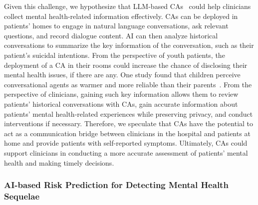 Given this challenge, we hypothesize that LLM-based CAs~\cite{yang2024talk2care, mahmood2023llm, chan2024human} could help clinicians collect mental health-related information effectively. 
CAs can be deployed in patients' homes to engage in natural language conversations, ask relevant questions, and record dialogue content. 
AI can then analyze historical conversations to summarize the key information of the conversation, such as their patient's suicidal intentions. 
From the perspective of youth patients, the deployment of a CA in their rooms could increase the chance of disclosing their mental health issues, if there are any.
One study found that children perceive conversational agents as warmer and more reliable than their parents~\cite{van2023children}.
From the perspective of clinicians, gaining such key information allows them to review patients' historical conversations with CAs, gain accurate information about patients' mental health-related experiences while preserving privacy, and conduct interventions if necessary.  
Therefore, we speculate that CAs have the potential to act as a communication bridge between clinicians in the hospital and patients at home and provide patients with self-reported symptoms. Ultimately, CAs could support clinicians in conducting a more accurate assessment of patients' mental health and making timely decisions.


\subsubsection{AI-based Risk Prediction for Detecting Mental Health Sequelae}
\label{sec:aifordetection}

